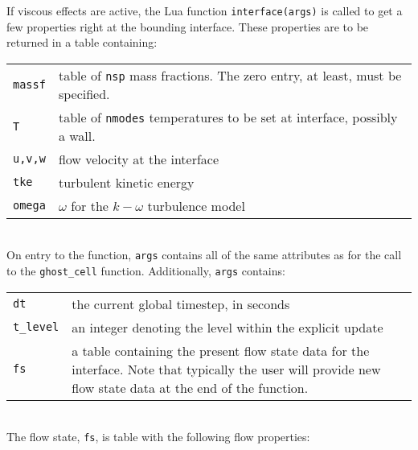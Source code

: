 \medskip
If viscous effects are active, the Lua function \texttt{interface(args)} is called to
get a few properties right at the bounding interface.
These properties are to be returned in a table containing:\\
\begin{tabular}{lp{12cm}}
 \texttt{massf} & table of \texttt{nsp} mass fractions. The zero entry, at least, must be specified. \\
 \texttt{T} & table of \texttt{nmodes} temperatures to be set at interface, possibly a wall.\\
 \texttt{u,v,w} & flow velocity at the interface \\
 \texttt{tke} &  turbulent kinetic energy \\
 \texttt{omega} &  $\omega$ for the $k-\omega$ turbulence model \\
\end{tabular}\\
On entry to the function, \texttt{args} contains all of the same attributes as for the call
to the \texttt{ghost\_cell} function. Additionally, \texttt{args} contains:\\
\begin{tabular}{lp{12cm}}
 \texttt{dt} &  the current global timestep, in seconds \\
 \texttt{t\_level} & an integer denoting the level within the explicit update\\
 \texttt{fs} &  a table containing the present flow state data for the interface. Note that typically
                the user will provide new flow state data at the end of the function.\\
\end{tabular}\\
The flow state, \texttt{fs}, is table with the following flow properties:\\
